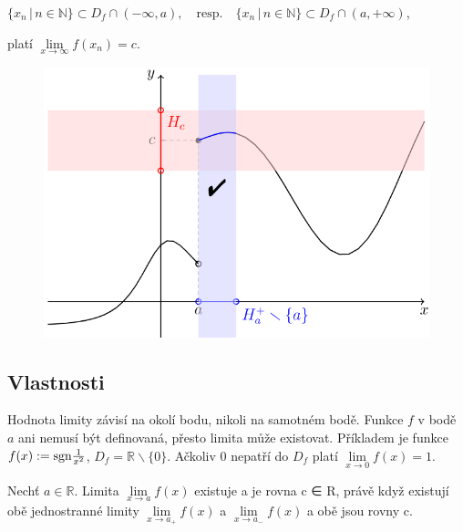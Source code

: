 \documentclass{szzclass}
\begin{document}
\begin{center}
    $\{x_n\, |\, n\in\mathbb{N}\} \subset D_f \cap (-\infty,a), \quad \textrm{resp.} \quad \{x_n\, |\, n\in\mathbb{N}\} \subset D_f \cap (a,+\infty)$,
\end{center}

platí
$\lim\limits_{x \rightarrow \infty} f(x_n) = c$.



\begin{figure}[h]
    \includegraphics[width=.6\textwidth, center]{topics/bi-spol-34/images/jed_lim.png}
\end{figure}


\subsection{Vlastnosti}
Hodnota limity závisí na okolí bodu, nikoli na samotném bodě. Funkce $f$ v bodě $a$
ani nemusí být definovaná, přesto limita může existovat. Příkladem je funkce
$f(x)\nolinebreak :=\nolinebreak \text{sgn} \frac{1}{x^2}$,
$D_f = \mathbb{R} \backslash \{0\}$.
Ačkoliv $0$ nepatří do $D_f$ platí $\lim\limits_{x\to 0} f(x) = 1$.

Nechť $a \in \mathbb{R}$. Limita $\lim\limits_{x \rightarrow a} f(x)$ existuje a je rovna c ∈ R, právě když existují obě
jednostranné limity $\lim\limits_{x \rightarrow a_+} f(x)$ a $\lim\limits_{x \rightarrow a_-} f(x)$ a obě jsou rovny c.
\end{document}
